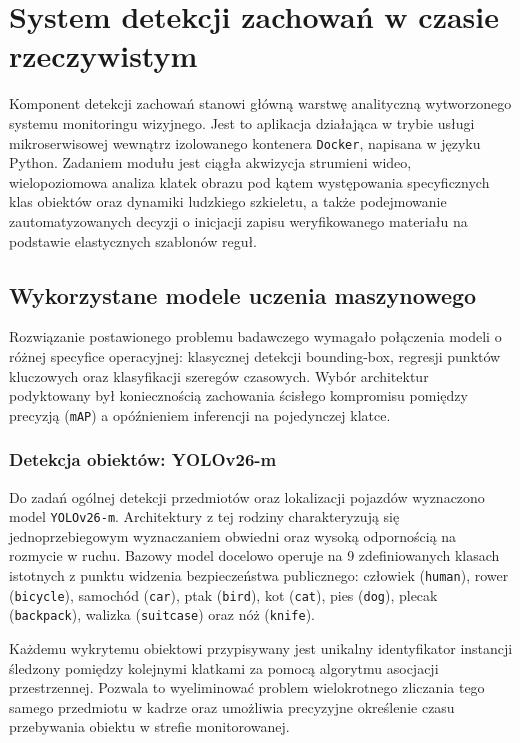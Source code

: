 \chapter{System detekcji zachowań w czasie rzeczywistym}\label{cha:detektor}

Komponent detekcji zachowań stanowi główną warstwę analityczną wytworzonego systemu monitoringu wizyjnego. Jest to aplikacja działająca w trybie usługi mikroserwisowej wewnątrz izolowanego kontenera \texttt{Docker}, napisana w języku Python. Zadaniem modułu jest ciągła akwizycja strumieni wideo, wielopoziomowa analiza klatek obrazu pod kątem występowania specyficznych klas obiektów oraz dynamiki ludzkiego szkieletu, a także podejmowanie zautomatyzowanych decyzji o inicjacji zapisu weryfikowanego materiału na podstawie elastycznych szablonów reguł.



\section{Wykorzystane modele uczenia maszynowego}\label{sec:detektor_modele}

Rozwiązanie postawionego problemu badawczego wymagało połączenia modeli o różnej specyfice operacyjnej: klasycznej detekcji bounding-box, regresji punktów kluczowych oraz klasyfikacji szeregów czasowych. Wybór architektur podyktowany był koniecznością zachowania ścisłego kompromisu pomiędzy precyzją (\texttt{mAP}) a opóźnieniem inferencji na pojedynczej klatce.

\subsection{Detekcja obiektów: YOLOv26-m}
Do zadań ogólnej detekcji przedmiotów oraz lokalizacji pojazdów wyznaczono model \texttt{YOLOv26-m}. Architektury z tej rodziny charakteryzują się jednoprzebiegowym wyznaczaniem obwiedni oraz wysoką odpornością na rozmycie w ruchu. Bazowy model docelowo operuje na 9 zdefiniowanych klasach istotnych z punktu widzenia bezpieczeństwa publicznego: człowiek (\texttt{human}), rower (\texttt{bicycle}), samochód (\texttt{car}), ptak (\texttt{bird}), kot (\texttt{cat}), pies (\texttt{dog}), plecak (\texttt{backpack}), walizka (\texttt{suitcase}) oraz nóż (\texttt{knife}). 

Każdemu wykrytemu obiektowi przypisywany jest unikalny identyfikator instancji śledzony pomiędzy kolejnymi klatkami za pomocą algorytmu asocjacji przestrzennej. Pozwala to wyeliminować problem wielokrotnego zliczania tego samego przedmiotu w kadrze oraz umożliwia precyzyjne określenie czasu przebywania obiektu w strefie monitorowanej.

